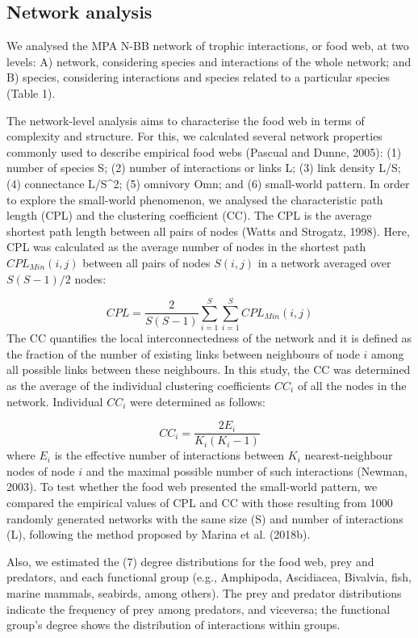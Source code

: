 \documentclass[preprint, 3p,
authoryear]{elsarticle} %
\begin{document}
\hypertarget{network-analysis}{%
\subsection{Network analysis}\label{network-analysis}}

We analysed the MPA N-BB network of trophic interactions, or food web,
at two levels: A) network, considering species and interactions of the
whole network; and B) species, considering interactions and species
related to a particular species (Table 1).

The network-level analysis aims to characterise the food web in terms of
complexity and structure. For this, we calculated several network
properties commonly used to describe empirical food webs (Pascual and
Dunne, 2005): (1) number of species S; (2) number of interactions or
links L; (3) link density L/S; (4) connectance L/S\^{}2; (5) omnivory
Omn; and (6) small-world pattern. In order to explore the small-world
phenomenon, we analysed the characteristic path length (CPL) and the
clustering coefficient (CC). The CPL is the average shortest path length
between all pairs of nodes (Watts and Strogatz, 1998). Here, CPL was
calculated as the average number of nodes in the shortest path
\(CPL_{Min} (i,j)\) between all pairs of nodes \(S(i,j)\) in a network
averaged over \(S(S-1)/2\) nodes:

\[
CPL = \frac{2}{S(S-1)} \sum_{i = 1}^{S} \sum_{i = 1}^{S} {CPL_{Min}(i,j)}
\] The CC quantifies the local interconnectedness of the network and it
is defined as the fraction of the number of existing links between
neighbours of node \(i\) among all possible links between these
neighbours. In this study, the CC was determined as the average of the
individual clustering coefficients \(CC_i\) of all the nodes in the
network. Individual \(CC_i\) were determined as follows:

\[
CC_i = \frac{2E_i}{K_i(K_i-1)}
\] where \(E_i\) is the effective number of interactions between \(K_i\)
nearest-neighbour nodes of node \(i\) and the maximal possible number of
such interactions (Newman, 2003). To test whether the food web presented
the small-world pattern, we compared the empirical values of CPL and CC
with those resulting from 1000 randomly generated networks with the same
size (S) and number of interactions (L), following the method proposed
by Marina et al. (2018b).

Also, we estimated the (7) degree distributions for the food web, prey
and predators, and each functional group (e.g., Amphipoda, Ascidiacea,
Bivalvia, fish, marine mammals, seabirds, among others). The prey and
predator distributions indicate the frequency of prey among predators,
and viceversa; the functional group's degree shows the distribution of
interactions within groups.
\end{document}
